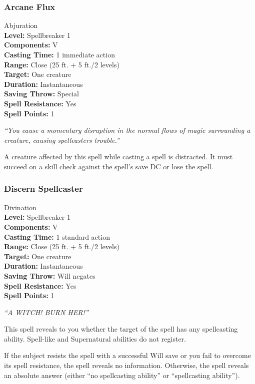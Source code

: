 \subsubsection{Arcane Flux}
\label{Spell:ArcaneFlux}
Abjuration
\\ \textbf{Level:} Spellbreaker 1
\\ \textbf{Components:} V
\\ \textbf{Casting Time:} 1 immediate action
\\ \textbf{Range:} Close (25 ft. + 5 ft./2 levels)
\\ \textbf{Target:} One creature
\\ \textbf{Duration:} Instantaneous
\\ \textbf{Saving Throw:} Special
\\ \textbf{Spell Resistance:} Yes
\\ \textbf{Spell Points:} 1

\emph{``You cause a momentary disruption in the normal flows of magic surrounding a creature, causing spellcasters trouble.''}

A creature affected by this spell while casting a spell is distracted. It must succeed on a  skill check against the spell's save DC or lose the spell.
\subsubsection{Discern Spellcaster}
\label{Spell:DiscernSpellcaster}
Divination
\\ \textbf{Level:} Spellbreaker 1
\\ \textbf{Components:} V
\\ \textbf{Casting Time:} 1 standard action
\\ \textbf{Range:} Close (25 ft. + 5 ft./2 levels)
\\ \textbf{Target:} One creature
\\ \textbf{Duration:} Instantaneous
\\ \textbf{Saving Throw:} Will negates
\\ \textbf{Spell Resistance:} Yes
\\ \textbf{Spell Points:} 1

\emph{``A WITCH! BURN HER!''}

This spell reveals to you whether the target of the spell has any spellcasting ability. Spell-like and Supernatural abilities do not register.

If the subject resists the spell with a successful Will save or you fail to overcome its spell resistance, the spell reveals no information. Otherwise, the spell reveals an absolute answer (either ``no spellcasting ability'' or ``spellcasting ability'').

